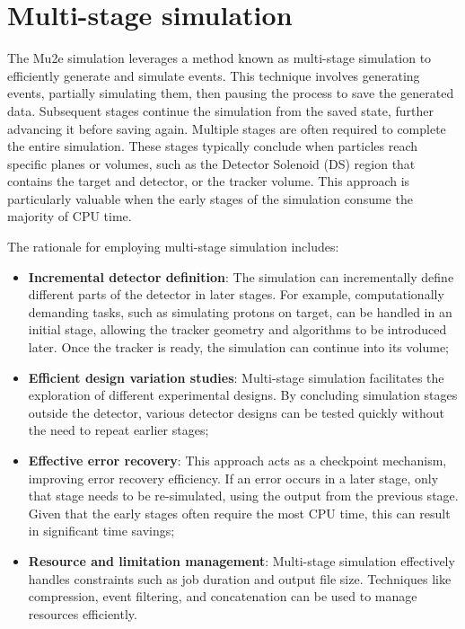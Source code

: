 \section{Multi-stage simulation}

The Mu2e simulation leverages a method known as multi-stage 
simulation to efficiently generate and simulate events. This 
technique involves generating events, partially simulating them, 
then pausing the process to save the generated data. Subsequent 
stages continue the simulation from the saved state, further 
advancing it before saving again. Multiple stages are often 
required to complete the entire simulation. These stages typically 
conclude when particles reach specific planes or volumes, such as 
the Detector Solenoid (DS) region that contains the target and 
detector, or the tracker volume. This approach is particularly 
valuable when the early stages of the simulation consume the 
majority of CPU time.

The rationale for employing multi-stage simulation includes:

\begin{itemize}
    \item \textbf{Incremental detector definition}: The simulation can 
    incrementally define different parts of the detector in later stages. 
    For example, computationally demanding tasks, such as simulating protons 
    on target, can be handled in an initial stage, allowing the tracker 
    geometry and algorithms to be introduced later. Once the tracker is 
    ready, the simulation can continue into its volume;
    \item \textbf{Efficient design variation studies}: Multi-stage 
    simulation facilitates the exploration of different experimental 
    designs. By concluding simulation stages outside the detector, 
    various detector designs can be tested quickly without the need to repeat earlier stages;
    \item \textbf{Effective error recovery}: This approach acts as a 
    checkpoint mechanism, improving error recovery efficiency. If an 
    error occurs in a later stage, only that stage needs to be re-simulated, 
    using the output from the previous stage. Given that the early stages 
    often require the most CPU time, this can result in significant time savings;
    \item \textbf{Resource and limitation management}: Multi-stage simulation 
    effectively handles constraints such as job duration and output file size. 
    Techniques like compression, event filtering, and concatenation can be used 
    to manage resources efficiently.
\end{itemize}

